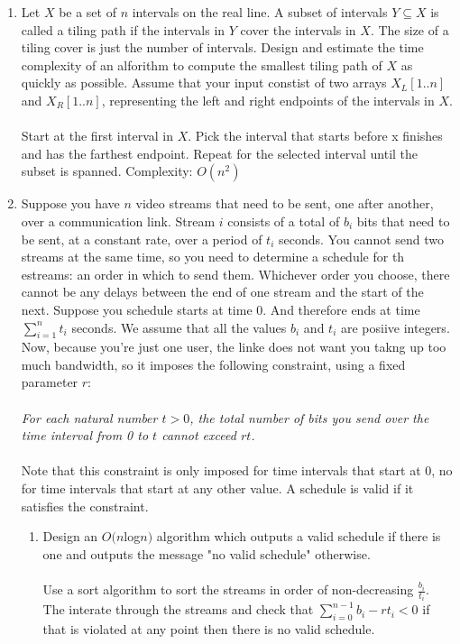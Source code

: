 \documentclass[a4paper]{article}
\begin{document}
\begin{enumerate}
		\item Let $X$ be a set of $n$ intervals on the real line. A subset of intervals $Y \subseteq X$ is called a tiling path if the intervals in $Y$ cover the intervals in $X$. The size of a tiling cover is just the number of intervals. Design and estimate the time complexity of an alforithm to compute the smallest tiling path of $X$ as quickly as possible. Assume that your input constist of two arrays $X_{L}[1..n]$ and $X_{R}[1..n]$, representing the left and right endpoints of the intervals in $X$.\\ \\
				Start at the first interval in $X$. Pick the interval that starts before x finishes and has the farthest endpoint. Repeat for the selected interval until the subset is spanned. Complexity: $O(n^2)$
		\item Suppose you have $n$ video streams that need to be sent, one after another, over a communication link. Stream $i$ consists of a total of $b_i$ bits that need to be sent, at a constant rate, over a period of $t_i$ seconds. You cannot send two streams at the same time, so you need to determine a schedule for th estreams: an order in which to send them. Whichever order you choose, there cannot be any delays between the end of one stream and the start of the next. Suppose you schedule starts at time 0. And therefore ends at time $\sum_{i=1}^{n}t_i$ seconds. We assume that all the values $b_i$ and $t_i$ are posiive integers. Now, because you're just one user, the linke does not want you takng up too much bandwidth, so it imposes the following constraint, using a fixed parameter $r$: \\ \\
				\textit{For each natural number $t > 0$, the total number of bits you send over the time interval from 0 to $t$ cannot exceed $rt$.} \\ \\
				Note that this constraint is only imposed for time intervals that start at 0, no for time intervals that start at any other value. A schedule is valid if it satisfies the constraint. \\ 
				\begin{enumerate}
						\item Design an $O(n$log$n)$ algorithm which outputs a valid schedule if there is one and outputs the message "no valid schedule" otherwise. \\ \\
								Use a sort algorithm to sort the streams in order of non-decreasing $\frac{b_i}{t_i}$. The interate through the streams and check that $\sum_{i=0}^{n-1} b_i - rt_i < 0$ if that is violated at any point then there is no valid schedule.

\end{enumerate}
\end{enumerate}
\end{document}
